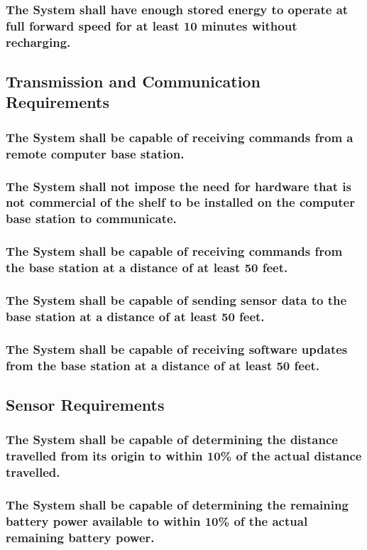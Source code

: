 \documentclass[12pt]{article}
\begin{document}
\subsubsection{The System shall have enough stored energy to operate at full forward speed for at least 10 minutes without recharging.}

\subsection{Transmission and Communication Requirements}
\subsubsection{The System shall be capable of receiving commands from a remote computer base station.}
\subsubsection{The System shall not impose the need for hardware that is not commercial of the shelf to be installed on the computer base station to communicate.}
\subsubsection{The System shall be capable of receiving commands from the base station at a distance of at least 50 feet.}
\subsubsection{The System shall be capable of sending sensor data to the base station at a distance of at least 50 feet.}
\subsubsection{The System shall be capable of receiving software updates from the base station at a distance of at least 50 feet.}

\subsection{Sensor Requirements}
\subsubsection{The System shall be capable of determining the distance travelled from its origin to within 10\% of the actual distance travelled.}
\subsubsection{The System shall be capable of determining the remaining battery power available to within 10\% of the actual remaining battery power.}
\end{document}
